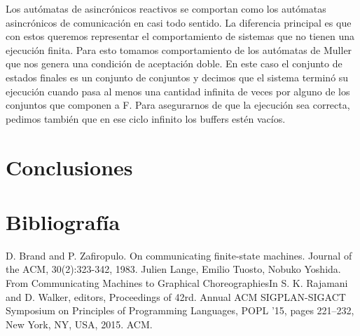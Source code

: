 \documentclass[paper=a4, fontsize=11pt, spanish]{scrartcl} %
\numberwithin{equation}{section} %
\numberwithin{figure}{section} %
\numberwithin{table}{section} %
\begin{document}
Los autómatas de asincrónicos reactivos se comportan como los autómatas asincrónicos de comunicación en casi todo sentido. La diferencia principal es que con estos queremos representar el comportamiento de sistemas que no tienen una ejecución finita. Para esto tomamos comportamiento de los autómatas de Muller que nos genera una condición de aceptación doble. En este caso el conjunto de estados finales es un conjunto de conjuntos y decimos que el sistema terminó su ejecución cuando pasa al menos una cantidad infinita de veces por alguno de los conjuntos que componen a F. Para asegurarnos de que la ejecución sea correcta, pedimos también que en ese ciclo infinito los buffers estén vacíos.


\section{Conclusiones}

\section{Bibliografía}
\begin{thebibliography}{}
D. Brand and P. Zafiropulo. On communicating finite-state machines. Journal of the ACM, 30(2):323-342, 1983.
Julien Lange, Emilio Tuosto, Nobuko Yoshida. From Communicating Machines to Graphical ChoreographiesIn S. K. Rajamani and D. Walker, editors, Proceedings of 42rd. Annual ACM SIGPLAN-SIGACT Symposium on Principles of Programming Languages, POPL ’15, pages 221–232, New York, NY, USA, 2015. ACM.

\end{thebibliography}
\end{document}
